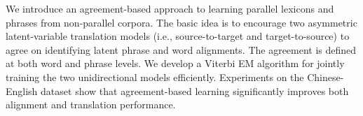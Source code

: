 We introduce an agreement-based approach to learning parallel lexicons and phrases from non-parallel corpora. The basic idea is to encourage two asymmetric latent-variable translation models (i.e., source-to-target and target-to-source) to agree on identifying latent phrase and word alignments. The agreement is defined at both word and phrase levels. We develop a Viterbi EM algorithm for jointly training the two unidirectional models efficiently. Experiments on the Chinese-English dataset show that agreement-based learning significantly improves both alignment and translation performance.
